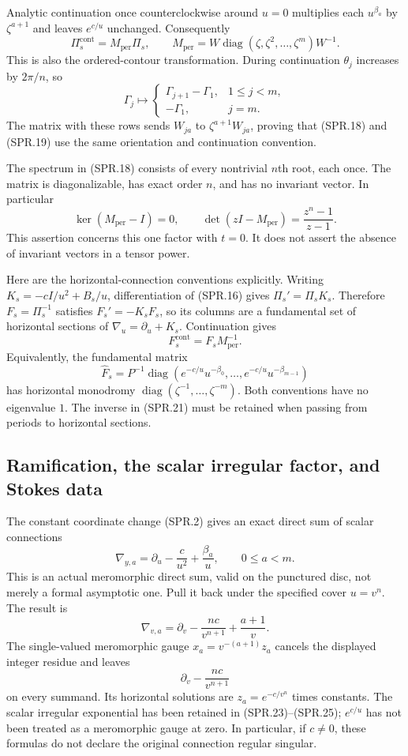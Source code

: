 Analytic continuation once counterclockwise around \(u=0\) multiplies
each \(u^{\beta_a}\) by \(\zeta^{a+1}\) and leaves \(e^{c/u}\)
unchanged. Consequently
\[
 \Pi_s^{\mathrm{cont}}=M_{\mathrm{per}}\Pi_s,\qquad
 M_{\mathrm{per}}
   =W\operatorname{diag}(\zeta,\zeta^2,\ldots,\zeta^m)W^{-1}.
 \tag{SPR.18}
\]
This is also the ordered-contour transformation. During continuation
\(\theta_j\) increases by \(2\pi/n\), so
\[
 \Gamma_j\longmapsto
 \begin{cases}
    \Gamma_{j+1}-\Gamma_1,&1\leq j<m,\\
    -\Gamma_1,&j=m.
 \end{cases}
 \tag{SPR.19}
\]
The matrix with these rows sends \(W_{ja}\) to
\(\zeta^{a+1}W_{ja}\), proving that (SPR.18) and (SPR.19)
use the same orientation and continuation convention.

The spectrum in (SPR.18) consists of every nontrivial \(n\)th root,
each once. The matrix is diagonalizable, has exact order \(n\), and
has no invariant vector. In particular
\[
 \ker(M_{\mathrm{per}}-I)=0,\qquad
 \det(zI-M_{\mathrm{per}})
       =\frac{z^n-1}{z-1}.
 \tag{SPR.20}
\]
This assertion concerns this one factor with \(t=0\). It does not
assert the absence of invariant vectors in a tensor power.

Here are the horizontal-connection conventions explicitly.
Writing \(K_s=-cI/u^2+B_s/u\), differentiation of (SPR.16) gives
\(\Pi_s'=\Pi_sK_s\). Therefore \(F_s=\Pi_s^{-1}\) satisfies
\(F_s'=-K_sF_s\), so its columns are a fundamental set of
horizontal sections of \(\nabla_u=\partial_u+K_s\).
Continuation gives
\[
 F_s^{\mathrm{cont}}=F_sM_{\mathrm{per}}^{-1}.
 \tag{SPR.21}
\]
Equivalently, the fundamental matrix
\[
 \widehat F_s
   =P^{-1}\operatorname{diag}
       (e^{-c/u}u^{-\beta_0},\ldots,e^{-c/u}u^{-\beta_{m-1}})
 \tag{SPR.22}
\]
has horizontal monodromy
\(\operatorname{diag}(\zeta^{-1},\ldots,\zeta^{-m})\).
Both conventions have no eigenvalue \(1\). The inverse in (SPR.21)
must be retained when passing from periods to horizontal sections.

\subsection*{Ramification, the scalar irregular factor, and Stokes data}

The constant coordinate change (SPR.2) gives an exact direct sum
of scalar connections
\[
 \nabla_{y,a}=\partial_u-\frac c{u^2}+\frac{\beta_a}{u},
 \qquad 0\leq a<m.
 \tag{SPR.23}
\]
This is an actual meromorphic direct sum, valid on the punctured
disc, not merely a formal asymptotic one. Pull it back under the
specified cover \(u=v^n\). The result is
\[
 \nabla_{v,a}
    =\partial_v-\frac{nc}{v^{n+1}}+\frac{a+1}{v}.
 \tag{SPR.24}
\]
The single-valued meromorphic gauge
\(x_a=v^{-(a+1)}z_a\) cancels the displayed integer residue and
leaves
\[
 \partial_v-\frac{nc}{v^{n+1}}
 \tag{SPR.25}
\]
on every summand. Its horizontal solutions are
\(z_a=e^{-c/v^n}\) times constants. The scalar irregular
exponential has been retained in (SPR.23)--(SPR.25);
\(e^{c/u}\) has not been treated as a meromorphic gauge at zero.
In particular, if \(c\ne0\), these formulas do not declare the
original connection regular singular.

